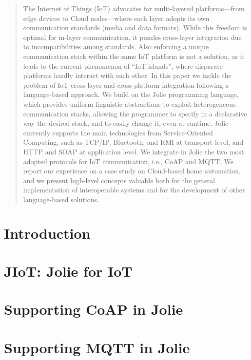 \documentclass[lnbip]{svmultln}
\begin{document}
\begin{abstract}
The Internet of Things (IoT) advocates for multi-layered platforms---from edge
devices to Cloud nodes---where each layer adopts its own communication
standards (media and data formats). While this freedom is optimal for in-layer
communication, it puzzles cross-layer integration due to incompatibilities
among standards. Also enforcing a unique communication stack within the same
IoT platform is not a solution, as it leads to the current phenomenon of ``IoT
islands'', where disparate platforms hardly interact with each other. In this
paper we tackle the problem of IoT cross-layer and cross-platform integration
following a language-based approach. We build on the Jolie programming
language, which provides uniform linguistic abstractions to exploit
heterogeneous communication stacks, allowing the programmer to specify in a
declarative way the desired stack, and to easily change it, even at runtime.
Jolie currently supports the main technologies from Service-Oriented Computing,
such as TCP/IP, Bluetooth, and RMI at transport level, and HTTP and SOAP at
application level. We integrate in Jolie the two most adopted protocols for IoT
communication, i.e., CoAP and MQTT. We report our experience on a case study on
Cloud-based home automation, and we present high-level concepts valuable both
for the general implementation of interoperable systems and for the development
of other language-based solutions.
\end{abstract}

\section{Introduction}
\label{sec:intro}


\section{JIoT: Jolie for IoT}
\label{sec:challenges}


\section{Supporting CoAP in Jolie}
\label{sub:coap}


\section{Supporting MQTT in Jolie}
\label{sub:mqtt}

\end{document}
